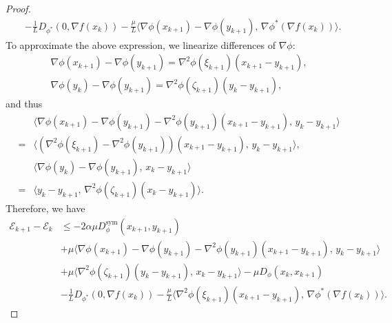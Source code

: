 \documentclass{article}
\theoremstyle{plain}
\theoremstyle{definition}
\theoremstyle{remark}
\begin{document}
\begin{proof}
\[\begin{aligned}
& - \frac{1}{L}D_{\phi^*}(0,\nabla f(x_{k})) - \frac{\mu}{L}\langle \nabla\phi(x_{k+1})-\nabla\phi(y_{k+1}),\,\nabla \phi^*(\nabla f(x_{k}))\rangle.
\end{aligned}
\]
To approximate the above expression, we linearize differences of \(\nabla\phi\):
\[
\begin{aligned}
\nabla \phi(x_{k+1})-\nabla\phi(y_{k+1})=\nabla^2\phi(\xi_{k+1})(x_{k+1}-y_{k+1}),\\
\nabla\phi(y_k)-\nabla\phi(y_{k+1})=\nabla^2\phi(\zeta_{k+1})(y_k-y_{k+1}),
\end{aligned}
\]
and thus
\[
\begin{aligned}
&\langle \nabla\phi(x_{k+1})-\nabla\phi(y_{k+1})-\nabla^2\phi(y_{k+1})(x_{k+1}-y_{k+1}),\,y_{k}-y_{k+1}\rangle\\
={}&\langle (\nabla^2\phi(\xi_{k+1})-\nabla^2\phi(y_{k+1}))(x_{k+1}-y_{k+1}),\,y_k-y_{k+1}\rangle,\\
&\langle \nabla\phi(y_k)-\nabla\phi(y_{k+1}),\, x_k - y_{k+1}\rangle \\
={}&\langle y_k-y_{k+1},\, \nabla^2\phi(\zeta_{k+1})(x_k - y_{k+1})\rangle.
\end{aligned}
\]
Therefore, we have
\[
\begin{aligned}
\mathcal{E}_{k+1}-\mathcal{E}_k
&\le
-2\alpha\mu D_\phi^{\text{sym}}(x_{k+1},y_{k+1})\\
&+\mu\langle \nabla\phi(x_{k+1})-\nabla\phi(y_{k+1})-\nabla^2\phi(y_{k+1})(x_{k+1}-y_{k+1}),\,y_{k}-y_{k+1}\rangle\\
&+\mu\langle \nabla^2\phi(\zeta_{k+1})(y_k-y_{k+1}),\, x_k - y_{k+1}\rangle 
- \mu D_\phi(x_k, x_{k+1})\\
& - \frac{1}{L}D_{\phi^*}(0,\nabla f(x_{k})) - \frac{\mu}{L}\langle \nabla^2\phi(\xi_{k+1})(x_{k+1}-y_{k+1}),\,\nabla \phi^*(\nabla f(x_{k}))\rangle.
\end{aligned}
\]
\end{proof}
\end{document}
